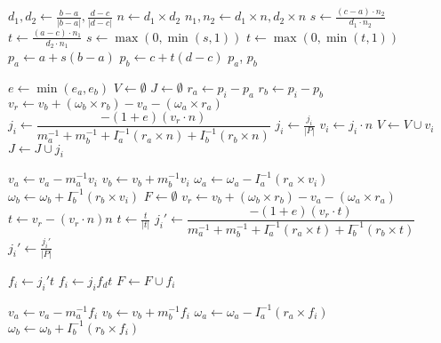 \documentclass{article}
\begin{document}
\newpage

\begin{algorithmic}
        \State $d_1, d_2 \gets \frac{b - a}{|b - a|}, \frac{d - c}{|d - c|}$
        \State $n \gets d_1 \times d_2$
        \State $n_1, n_2 \gets d_1 \times n, d_2 \times n$
        \State $s \gets \frac{(c - a) \cdot n_2}{d_1 \cdot n_2}$
        \State $t \gets \frac{(a - c) \cdot n_1}{d_2 \cdot n_1}$
        \State $s \gets \max(0, \min(s, 1))$
        \State $t \gets \max(0, \min(t, 1))$
        \State $p_a \gets a + s (b - a)$
        \State $p_b \gets c + t (d - c)$
        \State \Return $p_a$, $p_b$
    \EndFunction
\end{algorithmic}

\newpage
\begin{algorithmic}
        \State $e \gets \min(e_a, e_b)$
        \State $V \gets \emptyset$
        \State $J \gets \emptyset$
            \State $r_a \gets p_i - p_a$
            \State $r_b \gets p_i - p_b$
            \State $v_r \gets v_b + (\omega_b \times r_b) - v_a - (\omega_a \times r_a)$
            \State $j_i \gets \dfrac{-(1 + e)(v_r \cdot n)}{m_a^{-1} + m_b^{-1} + I_a^{-1} (r_a \times n) + I_b^{-1} (r_b \times n)}$
            \State $j_i \gets \frac{j_i}{|P|}$
            \State $v_i \gets j_i \cdot n$
            \State $V \gets V \cup v_i$
            \State $J \gets J \cup j_i$
        \EndFor

            \State $v_a \gets v_a - m_a^{-1} v_i$
            \State $v_b \gets v_b + m_b^{-1} v_i$
            \State $\omega_a \gets \omega_a - I_a^{-1} (r_a \times v_i)$
            \State $\omega_b \gets \omega_b + I_b^{-1} (r_b \times v_i)$
        \EndFor
        \Statex
        \State $F \gets \emptyset$
            \State $v_r \gets v_b + (\omega_b \times r_b) - v_a - (\omega_a \times r_a)$
            \State $t \gets v_r - (v_r \cdot n) n$
            \State $t \gets \frac{t}{|t|}$
            \State $j_i' \gets \dfrac{-(1 + e)(v_r \cdot t)}{m_a^{-1} + m_b^{-1} + I_a^{-1} (r_a \times t) + I_b^{-1} (r_b \times t)}$
            \State $j_i' \gets \frac{j_i'}{|P|}$

                \State $f_i \gets j_i' t$
            \Else
                \State $f_i \gets j_i f_d t$
            \EndIf
            \State $F \gets F \cup f_i$
        \EndFor

            \State $v_a \gets v_a - m_a^{-1} f_i$
            \State $v_b \gets v_b + m_b^{-1} f_i$
            \State $\omega_a \gets \omega_a - I_a^{-1} (r_a \times f_i)$
            \State $\omega_b \gets \omega_b + I_b^{-1} (r_b \times f_i)$
        \EndFor        
    \EndFunction
\end{algorithmic}
\end{document}
